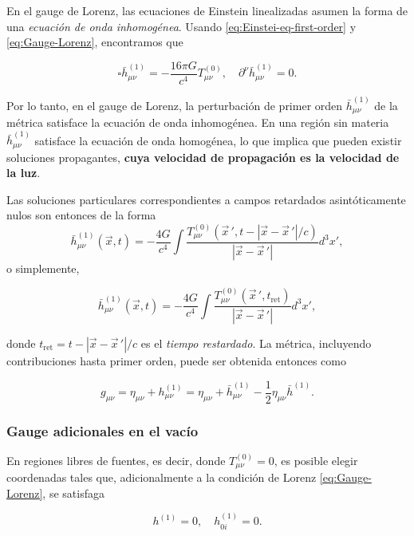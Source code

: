 \documentclass[letterpaper,11pt]{article}
\begin{document}
En el gauge de Lorenz, las ecuaciones de Einstein linealizadas asumen la forma de una \textit{ecuación de onda inhomogénea}. Usando \eqref{eq:Einstei-eq-first-order} y \eqref{eq:Gauge-Lorenz}, encontramos que
\begin{shaded}
\begin{equation}
\square \bar{h}_{\mu\nu}^{(1)} = - \frac{16\pi G}{c^4} T_{\mu\nu}^{(0)}, \quad \partial^{\nu} \bar{h}_{\mu\nu}^{(1)} = 0.
\end{equation}
\end{shaded}

Por lo tanto, en el gauge de Lorenz, la perturbación de primer orden $\bar{h}_{\mu\nu}^{(1)}$ de la métrica satisface la ecuación de onda inhomogénea. En una región sin materia $\bar{h}_{\mu\nu}^{(1)}$ satisface la ecuación de onda homogénea, lo que implica que pueden existir soluciones propagantes, \textbf{cuya velocidad de propagación es la velocidad de la luz}.

Las soluciones particulares correspondientes a campos retardados asintóticamente nulos son entonces de la forma
\begin{equation}
\bar{h}_{\mu\nu}^{(1)}(\vec{x},t) = - \frac{4G}{c^4} \int \frac{T_{\mu\nu}^{(0)}(\vec{x}\,', t - |\vec{x} - \vec{x}\,'|/c)}{|\vec{x} - \vec{x}\,'|} d^3x',
\end{equation}
o simplemente,
\begin{shaded}
\begin{equation}
\bar{h}_{\mu\nu}^{(1)}(\vec{x},t) = -  \frac{4G}{c^4} \int \frac{T_{\mu\nu}^{(0)}(\vec{x}\,', t_{\text{ret}})}{|\vec{x} - \vec{x}\,'|} d^3x',
\end{equation}
\end{shaded}
donde $t_{\text{ret}} =  t - |\vec{x} - \vec{x}\,'|/c$ es el \textit{tiempo restardado}. La métrica, incluyendo contribuciones hasta primer orden, puede ser obtenida entonces como
\begin{shaded}
\begin{equation}
g_{\mu\nu} = \eta_{\mu\nu} + h_{\mu\nu}^{(1)} = \eta_{\mu\nu} + \bar{h}_{\mu\nu}^{(1)} - \frac{1}{2} \eta_{\mu\nu} \bar{h}^{(1)}.
\end{equation}
\end{shaded}

\subsubsection{Gauge adicionales en el vacío}

En regiones libres de fuentes, es decir, donde $T_{\mu\nu}^{(0)}= 0$, es posible elegir coordenadas tales que, adicionalmente a la condición de Lorenz \eqref{eq:Gauge-Lorenz}, se satisfaga
\begin{shaded}
\begin{equation}
h^{(1)} = 0, \quad h_{0i}^{(1)} = 0.
\end{equation}
\end{shaded}
\end{document}
